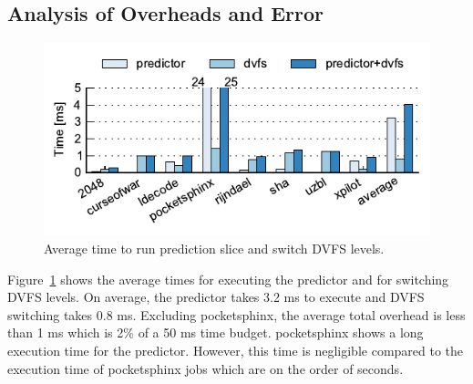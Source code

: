 \subsection{Analysis of Overheads and Error}
\label{sec:evaluation.overheads}


\begin{figure}
  \begin{center}
    \includegraphics{exec_time_prediction/data/overhead_time.pdf}
    \caption{Average time to run prediction slice and switch DVFS levels.}
    \label{fig:evaluation.overhead_time}
  \end{center}
\end{figure}

Figure~\ref{fig:evaluation.overhead_time} shows the average times for executing
the predictor and for switching DVFS levels. 
On average, the predictor takes 3.2 ms to execute and DVFS switching takes 0.8 ms.
Excluding pocketsphinx, the average total overhead is less than 1 ms which is
2\% of a 50 ms time budget.
pocketsphinx shows a long execution time for the predictor. However, this time
is negligible compared to the execution time of pocketsphinx jobs which are on
the order of seconds.


